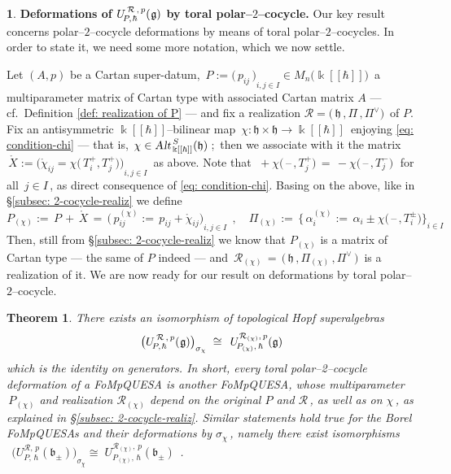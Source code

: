 \documentclass[12pt,reqno,twoside,a4paper]{amsart}
\numberwithin{equation}{section}
\newtheorem{theorem}[lema]{Theorem}
\theoremstyle{definition}
\newtheorem{free text}[lema]{}
\theoremstyle{remark}
\newcommand{\R}{{\mathcal R}}
\def \kh{{\Bbbk[[\hbar]]}}
\def \lieg{\mathfrak{g}}
\def \lieb{\mathfrak{b}}
\def \lieh{\mathfrak{h}}
\def \uRpPhg{U^{\,\R\,,\,p}_{\!P,\hskip0,7pt\hbar}(\hskip0,5pt\lieg)}
\theoremstyle{plain}
\begin{document}
\begin{free text}  \label{tor_2-coc_deform's_uPhgd}
%
 {\bf Deformations of  $ \uRpPhg $  by toral  polar--$ 2 $--cocycle.}
%
 Our key result concerns  polar--$ 2 $--cocycle  deformations by means of
 toral  polar--$ 2 $--cocycles.  In order to state it,
 we need some more notation, which we now settle.
                                                                                    \par
   Let $(A,p)$ be a Cartan super-datum,
   $ \, P := {\big(\, p_{ij} \,\big)}_{i, j \in I} \in M_n\big( \kh \big) \, $
   a multiparameter matrix of Cartan type with associated Cartan matrix $ A $
   ---  cf.\  Definition \ref{def: realization of P}  ---
   and fix a realization  $ \R = \big(\, \lieh \, , \Pi \, , \Pi^\vee \big) \, $  of  $ P $.
   Fix an antisymmetric  $ \kh $--bilinear map
   $ \, \chi \! : \lieh \times \lieh \! \longrightarrow \! \kh \, $
   enjoying  \eqref{eq: condition-chi}   --- that is,
   $ \, \chi \in \text{\sl Alt}_{\,\kh}^{\,S}(\lieh) \, $;
   \,then we associate with it the matrix
   $ \, \mathring{X} := \! {\Big( \mathring{\chi}_{i{}j} = \chi\big(\,T_i^+,T_j^+\big) \!\Big)}_{i, j \in I} \, $
   as above.  Note that
%
 $ \; + \chi\big(\, \text{--} \, , T_j^+ \big)  \, = \,  - \chi\big(\, \text{--} \, , T_j^- \big) \; $
%
 for all  $ \, j \in I \, $,  as direct consequence of  \eqref{eq: condition-chi}.
 Basing on the above, like in  \S \ref{subsec: 2-cocycle-realiz}  we define
%
  $$
  P_{(\chi)}  := \,  P \, + \, \mathring{X}  \, = \,  {\Big(\, p^{(\chi)}_{i{}j} :=
  \,  p_{ij} + \mathring{\chi}_{i{}j} \Big)}_{\! i, j \in I}  \;\, ,  \!\quad
   \Pi_{(\chi)}  := \,  {\Big\{\, \alpha_i^{(\chi)}  := \,
   \alpha_i \pm \chi\big(\, \text{--} \, , T_i^\pm \big)  \Big\}}_{i \in I}
   $$
%
\noindent
 Then, still from  \S \ref{subsec: 2-cocycle-realiz}  we know that
 $ P_{(\chi)} $  is a matrix of Cartan type   --- the same of  $ P $
 indeed ---   and
 $ \, \R_{(\chi)} \, = \, \big(\, \lieh \, , \Pi_{(\chi)} \, , \Pi^\vee \,\big) \, $
 is a realization of it.
%
 \vskip3pt
%
   We are now ready for our result on deformations by toral
   polar--$ 2 $--cocycle.
%
\end{free text}

\vskip7pt

\begin{theorem}  \label{thm: 2cocdef-uPhgd=new-uPhgd}
%
 There exists an isomorphism of topological Hopf superalgebras
%
  $$  {\big( \uRpPhg \big)}_{\sigma_\chi}  \; \cong \;\,  U_{\!P_{(\chi)},\,\hbar}^{\R_{(\chi)},\,p}(\lieg)  $$
%
 which is the identity on generators.  In short, every toral polar--2--cocycle deformation of a
 FoMpQUESA is another FoMpQUESA, whose multiparameter  $ \, P_{(\chi)} $  and realiza\-tion  $ \R_{(\chi)} $
 depend on the original  $ P $  and  $ \R \, $,  as well as on  $ \chi \, $,  as explained in  \S \ref{subsec: 2-cocycle-realiz}.
%
 \vskip5pt
%
   Similar statements hold true for the Borel FoMpQUESAs and their deformations by  $ \sigma_\chi \, $,  namely there exist isomorphisms  $ \,\; {\big( U_{\!P,\,\hbar}^{\R,\,p}(\lieb_\pm) \big)}_{\sigma_\chi} \cong \; U_{\!P_{(\chi)},\,\hbar}^{\R_{(\chi)},\,p}(\lieb_\pm) \;\, $.
%
\end{theorem}
\end{document}
